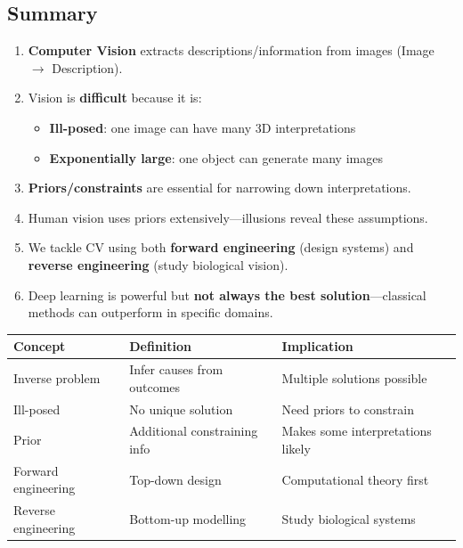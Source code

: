 \bigseparator

\subsection{Summary}

\begin{keybox}
\begin{enumerate}
  \item \textbf{Computer Vision} extracts descriptions/information from images (Image $\rightarrow$ Description).
  \item Vision is \textbf{difficult} because it is:
  \begin{itemize}
    \item \textbf{Ill-posed}: one image can have many 3D interpretations
    \item \textbf{Exponentially large}: one object can generate many images
  \end{itemize}
  \item \textbf{Priors/constraints} are essential for narrowing down interpretations.
  \item Human vision uses priors extensively---illusions reveal these assumptions.
  \item We tackle CV using both \textbf{forward engineering} (design systems) and \textbf{reverse engineering} (study biological vision).
  \item Deep learning is powerful but \textbf{not always the best solution}---classical methods can outperform in specific domains.
\end{enumerate}
\end{keybox}

\begin{center}
\renewcommand{\arraystretch}{1.3}
\begin{tabular}{@{} l l l @{}}
\toprule
\textbf{Concept} & \textbf{Definition} & \textbf{Implication} \\
\midrule
Inverse problem & Infer causes from outcomes & Multiple solutions possible \\
Ill-posed & No unique solution & Need priors to constrain \\
Prior & Additional constraining info & Makes some interpretations likely \\
Forward engineering & Top-down design & Computational theory first \\
Reverse engineering & Bottom-up modelling & Study biological systems \\
\bottomrule
\end{tabular}
\end{center}
